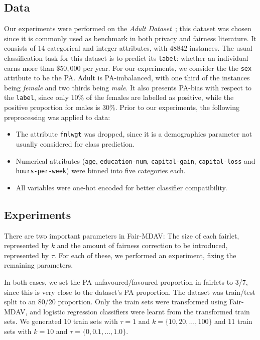 \documentclass[runningheads]{llncs}
\begin{document}
\subsection{Data}
\label{subsec:datasets}
Our experiments were performed on the \emph{Adult Dataset}~\cite{Dua2019}; this dataset was chosen since it is commonly used as benchmark in both privacy and fairness literature. It consists of 14 categorical and integer attributes, with 48842 instances. The usual classification task for this dataset is to predict its \texttt{label}: whether an individual earns more than $\$50,000$ per year. For our experiments, we consider the the \texttt{sex} attribute to be the PA.
Adult is PA-imbalanced, with one third of the instances being \emph{female} and two thirds being \emph{male}. It also presents PA-bias with respect to the \texttt{label}, since only $10\%$ of the females are labelled as positive, while the positive proportion for males is $30\%$. Prior to our experiments, the following preprocessing was applied to data:
\begin{itemize}
  \item The attribute \texttt{fnlwgt} was dropped, since it is a demographics parameter not usually considered for class prediction.
  \item Numerical attributes (\texttt{age}, \texttt{education-num}, \texttt{capital-gain}, \texttt{capital-loss} and \texttt{hours-per-week}) were binned into five categories each.
  \item All variables were one-hot encoded for better classifier compatibility.
\end{itemize}

\subsection{Experiments}
\label{subsec:experiments}

There are two important parameters in Fair-MDAV: The size of each fairlet, represented by $k$ and the amount of fairness correction to be introduced, represented by $\tau$. For each of these, we performed an experiment, fixing the remaining parameters.

In both cases, we set the PA unfavoured/favoured proportion in fairlets to 3/7, since this is very close to the dataset's PA proportion. The dataset was train/test split to an 80/20 proportion. Only the train sets were transformed using Fair-MDAV, and logistic regression classifiers were learnt from the transformed train sets. 
We generated 10 train sets with $\tau = 1$ and $k = \{10, 20, \dots, 100\}$ and 11 train sets with $k = 10$ and $\tau = \{0, 0.1, \dots, 1.0\}$.
\end{document}

